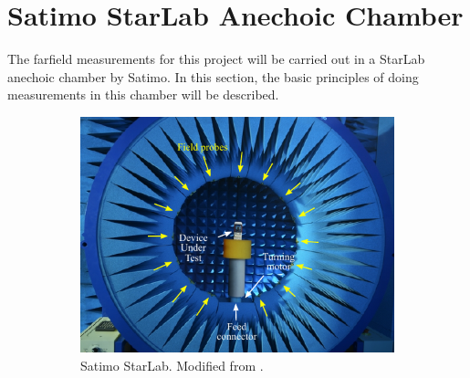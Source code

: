\section{Satimo StarLab Anechoic Chamber}

\begin{aautop}
    The farfield measurements for this project will be carried out in a StarLab anechoic chamber by Satimo. In this section, the basic principles of doing measurements in this chamber will be described.
\end{aautop}

\begin{figure}[htbp]
    \centering
    \begin{subfigure}[t]{0.49\linewidth} 
        \centering
        \includegraphics{img/analysis/satimo}
        \caption{Satimo StarLab. Modified from \cite{satimo}.}
        \label{fig:starlabchamber}
    \end{subfigure}
    \hfill
    \begin{subfigure}[t]{0.49\linewidth}
        \centering

\end{subfigure}
\end{figure}
